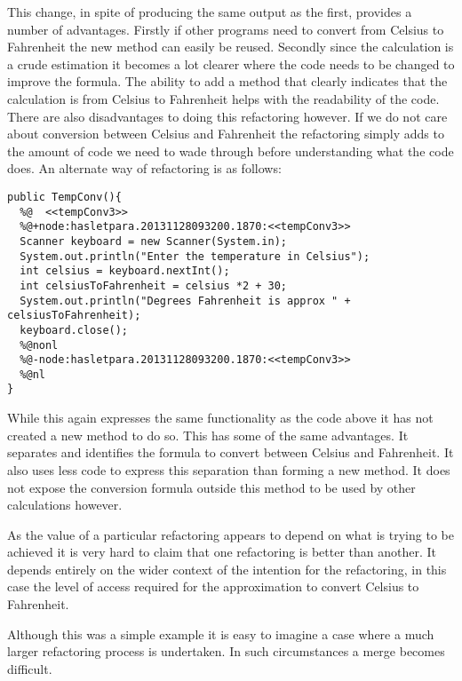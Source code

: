 \documentclass[12pt]{CRPITStyle}
\begin{document}
This change, in spite of producing the same output as the first, provides a number of advantages. Firstly if other programs need to convert from Celsius to Fahrenheit the new method can easily be reused. Secondly since the calculation is a crude estimation it becomes a lot clearer where the code needs to be changed to improve the formula. The ability to add a method that clearly indicates that the calculation is from Celsius to Fahrenheit helps with the readability of the code. There are also disadvantages to doing this refactoring however. If we do not care about conversion between Celsius and Fahrenheit the refactoring simply adds to the amount of code we need to wade through before understanding what the code does. An alternate way of refactoring is as follows:

\begin{verbatim}
public TempConv(){
  %@  <<tempConv3>>
  %@+node:hasletpara.20131128093200.1870:<<tempConv3>>
  Scanner keyboard = new Scanner(System.in);
  System.out.println("Enter the temperature in Celsius");
  int celsius = keyboard.nextInt();
  int celsiusToFahrenheit = celsius *2 + 30;
  System.out.println("Degrees Fahrenheit is approx " + celsiusToFahrenheit);
  keyboard.close();
  %@nonl
  %@-node:hasletpara.20131128093200.1870:<<tempConv3>>
  %@nl
}
\end{verbatim}

While this again expresses the same functionality as the code above it has not created a new method to do so. This has some of the same advantages. It separates and identifies the formula to convert between Celsius and Fahrenheit. It also uses less code to express this separation than forming a new method. It does not expose the conversion formula outside this method to be used by other calculations however.

As the value of a particular refactoring appears to depend on what is trying to be achieved it is very hard to claim that one refactoring is better than another. It depends entirely on the wider context of the intention for the refactoring, in this case the level of access required for the approximation to convert Celsius to Fahrenheit.

Although this was a simple example it is easy to imagine a case where a much larger refactoring process is undertaken. In such circumstances a merge becomes difficult. 
\end{document}
